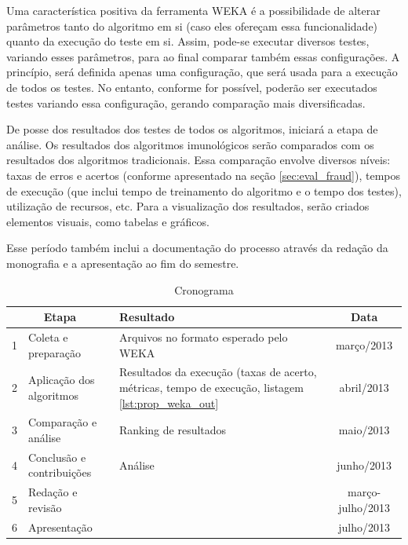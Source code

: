 Uma característica positiva da ferramenta WEKA é a possibilidade de alterar parâmetros tanto do algoritmo em si (caso eles ofereçam essa funcionalidade) quanto da execução do teste em si. Assim, pode-se executar diversos testes, variando esses parâmetros, para ao final comparar também essas configurações. A princípio, será definida apenas uma configuração, que será usada para a execução de todos os testes. No entanto, conforme for possível, poderão ser executados testes variando essa configuração, gerando comparação mais diversificadas.

De posse dos resultados dos testes de todos os algoritmos, iniciará a etapa de análise. Os resultados dos algoritmos imunológicos serão comparados com os resultados dos algoritmos tradicionais. Essa comparação envolve diversos níveis: taxas de erros e acertos (conforme apresentado na seção \ref{sec:eval_fraud}), tempos de execução (que inclui tempo de treinamento do algoritmo e o tempo dos testes), utilização de recursos, etc. Para a visualização dos resultados, serão criados elementos visuais, como tabelas e gráficos.

Esse período também inclui a documentação do processo através da redação da monografia e a apresentação ao fim do semestre.

\vspace{0.5cm}
\begin{table}[h]
    \centering
    \caption{Cronograma}
    \label{tab:prop_cron}
    \vspace{0.5cm}
    \begin{tabular}{l >{\arraybackslash}m{5cm} >{\centering\arraybackslash}m{6cm} c}
        \multicolumn{2}{c}{Etapa} & Resultado & Data \\
        \hline
        1 & Coleta e preparação                 & Arquivos no formato esperado pelo WEKA & março/2013 \\
        2 & Aplicação dos algoritmos            & Resultados da execução (taxas de acerto, métricas, tempo de execução, listagem \ref{lst:prop_weka_out} & abril/2013 \\
        3 & Comparação e análise                & Ranking de resultados & maio/2013 \\
        4 & Conclusão e contribuições           & Análise & junho/2013 \\
        5 & Redação e revisão                   & & março-julho/2013 \\
        6 & Apresentação                        & & julho/2013 \\
    \end{tabular}
\end{table}
\vspace{0.5cm}

